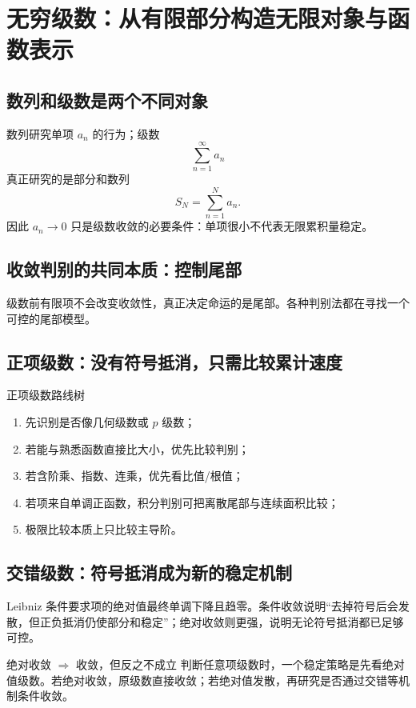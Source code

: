 \documentclass[11pt,a4paper,openany]{ctexbook}
\begin{document}
\chapter{无穷级数：从有限部分构造无限对象与函数表示}

\section{数列和级数是两个不同对象}
数列研究单项 $a_n$ 的行为；级数
\[
\sum_{n=1}^{\infty}a_n
\]
真正研究的是部分和数列
\[
S_N=\sum_{n=1}^{N}a_n.
\]
因此 $a_n\to0$ 只是级数收敛的必要条件：单项很小不代表无限累积量稳定。

\section{收敛判别的共同本质：控制尾部}
级数前有限项不会改变收敛性，真正决定命运的是尾部。各种判别法都在寻找一个可控的尾部模型。

\section{正项级数：没有符号抵消，只需比较累计速度}
\begin{methodbox}{正项级数路线树}
\begin{enumerate}
  \item 先识别是否像几何级数或 $p$ 级数；
  \item 若能与熟悉函数直接比大小，优先比较判别；
  \item 若含阶乘、指数、连乘，优先看比值/根值；
  \item 若项来自单调正函数，积分判别可把离散尾部与连续面积比较；
  \item 极限比较本质上只比较主导阶。
\end{enumerate}
\end{methodbox}

\section{交错级数：符号抵消成为新的稳定机制}
Leibniz 条件要求项的绝对值最终单调下降且趋零。条件收敛说明“去掉符号后会发散，但正负抵消仍使部分和稳定”；绝对收敛则更强，说明无论符号抵消都已足够可控。

\begin{boundarybox}{绝对收敛 $\Rightarrow$ 收敛，但反之不成立}
判断任意项级数时，一个稳定策略是先看绝对值级数。若绝对收敛，原级数直接收敛；若绝对值发散，再研究是否通过交错等机制条件收敛。
\end{boundarybox}
\end{document}
